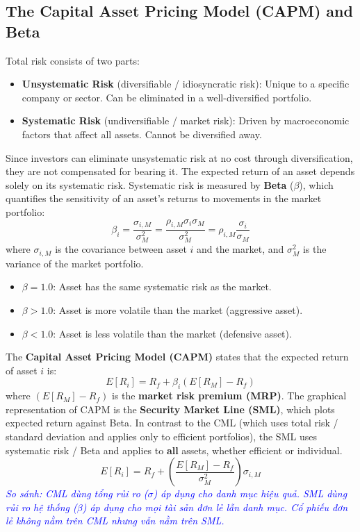 \subsection{The Capital Asset Pricing Model (CAPM) and Beta}
\label{subsec:CAPM}
Total risk consists of two parts:
\begin{itemize}
	\item \textbf{Unsystematic Risk} (diversifiable / idiosyncratic risk): Unique to a specific company or sector. Can be eliminated in a well-diversified portfolio.
	\item \textbf{Systematic Risk} (undiversifiable / market risk): Driven by macroeconomic factors that affect all assets. Cannot be diversified away.
\end{itemize}
Since investors can eliminate unsystematic risk at no cost through diversification, they are not compensated for bearing it. The expected return of an asset depends solely on its systematic risk.
Systematic risk is measured by \textbf{Beta} ($\beta$), which quantifies the sensitivity of an asset's returns to movements in the market portfolio:
\begin{equation}
	\beta_i = \frac{\sigma_{i,M}}{\sigma_M^2} = \frac{\rho_{i,M} \sigma_i \sigma_M}{\sigma_M^2} = \rho_{i,M} \frac{\sigma_i}{\sigma_M}
	\label{eq:beta_definition_m8}
\end{equation}
where $\sigma_{i,M}$ is the covariance between asset $i$ and the market, and $\sigma_M^2$ is the variance of the market portfolio.
\begin{itemize}
	\item $\beta = 1.0$: Asset has the same systematic risk as the market.
	\item $\beta > 1.0$: Asset is more volatile than the market (aggressive asset).
	\item $\beta < 1.0$: Asset is less volatile than the market (defensive asset).
\end{itemize}
The \textbf{Capital Asset Pricing Model (CAPM)} states that the expected return of asset $i$ is:
\begin{equation}
	E[R_i] = R_f + \beta_i \left( E[R_M] - R_f \right)
	\label{eq:CAPM_equation_m8}
\end{equation}
where $\left( E[R_M] - R_f \right)$ is the \textbf{market risk premium (MRP)}.
The graphical representation of CAPM is the \textbf{Security Market Line (SML)}, which plots expected return against Beta. In contrast to the CML (which uses total risk / standard deviation and applies only to efficient portfolios), the SML uses systematic risk / Beta and applies to \textbf{all} assets, whether efficient or individual.
\begin{equation}
	E[R_i] = R_f + \left(\frac{E[R_M] - R_f}{\sigma_M^2}\right) \sigma_{i,M}
	\label{eq:SML_covariance_form_m8}
\end{equation}
\textcolor{blue}{\textit{So sánh: CML dùng tổng rủi ro ($\sigma$) áp dụng cho danh mục hiệu quả. SML dùng rủi ro hệ thống ($\beta$) áp dụng cho mọi tài sản đơn lẻ lẫn danh mục. Cổ phiếu đơn lẻ không nằm trên CML nhưng vẫn nằm trên SML.}}

